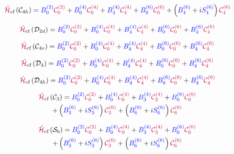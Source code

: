 \begin{multline}
\hamCrystalFieldSymbol\left(\groupSymbol{C}{4h}\right)  = \Bkq{2}{0} \Ckq{2}{0} + 
 \Bkq{4}{0} \Ckq{4}{0} + 
 \Bkq{4}{4} \Ckq{4}{4} + 
 \Bkq{6}{0} \Ckq{6}{0} + 
 \left(\Bkq{6}{4} + \iu \Skq{6}{4}\right) \Ckq{6}{4}
\label{eqn:cf:C4h}
\end{multline}


\begin{equation}
\hamCrystalFieldSymbol\left(\groupSymbol{D}{2d}\right)  = \Bkq{2}{0} \Ckq{2}{0} + 
 \Bkq{4}{0} \Ckq{4}{0} + 
 \Bkq{4}{4} \Ckq{4}{4} + 
 \Bkq{6}{0} \Ckq{6}{0} + 
 \Bkq{6}{4} \Ckq{6}{4}
\label{eqn:cf:D2d}
\end{equation}


\begin{equation}
\hamCrystalFieldSymbol\left(\groupSymbol{C}{4v}\right)  = \Bkq{2}{0} \Ckq{2}{0} + 
 \Bkq{4}{0} \Ckq{4}{0} + 
 \Bkq{4}{4} \Ckq{4}{4} + 
 \Bkq{6}{0} \Ckq{6}{0} + 
 \Bkq{6}{4} \Ckq{6}{4}
\label{eqn:cf:C4v}
\end{equation}


\begin{equation}
\hamCrystalFieldSymbol\left(\groupSymbol{D}{4}\right)  = \Bkq{2}{0} \Ckq{2}{0} + 
 \Bkq{4}{0} \Ckq{4}{0} + 
 \Bkq{4}{4} \Ckq{4}{4} + 
 \Bkq{6}{0} \Ckq{6}{0} + 
 \Bkq{6}{4} \Ckq{6}{4}
\label{eqn:cf:D4}
\end{equation}


\begin{equation}
\hamCrystalFieldSymbol\left(\groupSymbol{D}{4h}\right)  = \Bkq{2}{0} \Ckq{2}{0} + 
 \Bkq{4}{0} \Ckq{4}{0} + 
 \Bkq{4}{4} \Ckq{4}{4} + 
 \Bkq{6}{0} \Ckq{6}{0} + 
 \Bkq{6}{4} \Ckq{6}{4}
\label{eqn:cf:D4h}
\end{equation}


\begin{multline}
\hamCrystalFieldSymbol\left(\groupSymbol{C}{3}\right)  = \Bkq{2}{0} \Ckq{2}{0} + 
 \Bkq{4}{0} \Ckq{4}{0} + 
 \Bkq{4}{3} \Ckq{4}{3} + 
 \Bkq{6}{0} \Ckq{6}{0} \\ 
 + \left(\Bkq{6}{3} + \iu \Skq{6}{3}\right) \Ckq{6}{3} + 
 \left(\Bkq{6}{6} + \iu \Skq{6}{6}\right) \Ckq{6}{6}
\label{eqn:cf:C3}
\end{multline}


\begin{multline}
\hamCrystalFieldSymbol\left(\groupSymbol{S}{6}\right)  = \Bkq{2}{0} \Ckq{2}{0} + 
 \Bkq{4}{0} \Ckq{4}{0} + 
 \Bkq{4}{3} \Ckq{4}{3} + 
 \Bkq{6}{0} \Ckq{6}{0} \\ 
 + \left(\Bkq{6}{3} + \iu \Skq{6}{3}\right) \Ckq{6}{3} + 
 \left(\Bkq{6}{6} + \iu \Skq{6}{6}\right) \Ckq{6}{6}
\label{eqn:cf:S6}
\end{multline}


